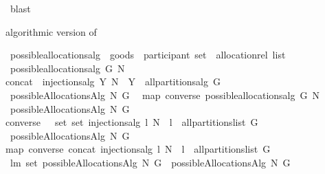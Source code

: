 \begin{isabellebody}
\ blast%
\endisatagproof
{\isafoldproof}%
%
\isadelimproof
\isanewline
%
\endisadelimproof
{}\isamarkupfalse%
%
\begin{isamarkuptext}%
algorithmic version of %
\end{isamarkuptext}%
\isamarkuptrue%
\isamarkupfalse%
\ possible{\isacharunderscore}allocations{\isacharunderscore}alg\ {\isacharcolon}{\isacharcolon}\ {\isachardoublequoteopen}goods\ {\isasymRightarrow}\ participant\ set\ {\isasymRightarrow}\ allocation{\isacharunderscore}rel\ list{\isachardoublequoteclose}\isanewline
{}\ {\isachardoublequoteopen}possible{\isacharunderscore}allocations{\isacharunderscore}alg\ G\ N\ {\isacharequal}\ \isanewline
concat\ {\isacharbrackleft}\ injections{\isacharunderscore}alg\ Y\ N\ {\isachardot}\ Y\ {\isasymleftarrow}\ all{\isacharunderscore}partitions{\isacharunderscore}alg\ G\ {\isacharbrackright}{\isachardoublequoteclose}\isanewline
{}\isamarkupfalse%
\ {\isachardoublequoteopen}possibleAllocationsAlg\ N\ G\ {\isacharequal}{\isacharequal}\ \isanewline
{\isacharparenleft}map\ converse\ {\isacharparenleft}possible{\isacharunderscore}allocations{\isacharunderscore}alg\ G\ N{\isacharparenright}{\isacharparenright}{\isachardoublequoteclose}\isanewline
{}\isamarkupfalse%
\ {\isachardoublequoteopen}possibleAllocationsAlg{}\ N\ G\ {\isacharequal}{\isacharequal}\ \isanewline
converse\ {\isacharbackquote}\ {\isacharparenleft}{\isasymUnion}\ set\ {\isacharbrackleft}set\ {\isacharparenleft}injections{\isacharunderscore}alg\ l\ N{\isacharparenright}\ {\isachardot}\ l\ {\isasymleftarrow}\ all{\isacharunderscore}partitions{\isacharunderscore}list\ G{\isacharbrackright}{\isacharparenright}{\isachardoublequoteclose}\isanewline
{}\isamarkupfalse%
\ {\isachardoublequoteopen}possibleAllocationsAlg{}\ N\ G\ {\isacharequal}{\isacharequal}\ \isanewline
map\ converse\ {\isacharparenleft}concat\ {\isacharbrackleft}{\isacharparenleft}injections{\isacharunderscore}alg\ l\ N{\isacharparenright}\ {\isachardot}\ l\ {\isasymleftarrow}\ all{\isacharunderscore}partitions{\isacharunderscore}list\ G{\isacharbrackright}{\isacharparenright}{\isachardoublequoteclose}\isanewline
{}\isamarkupfalse%
\ lm{}{}{\isacharcolon}\ {\isachardoublequoteopen}set\ {\isacharparenleft}possibleAllocationsAlg{}\ N\ G{\isacharparenright}\ {\isacharequal}\ possibleAllocationsAlg{}\ N\ G{\isachardoublequoteclose}\isanewline

\end{isabellebody}
